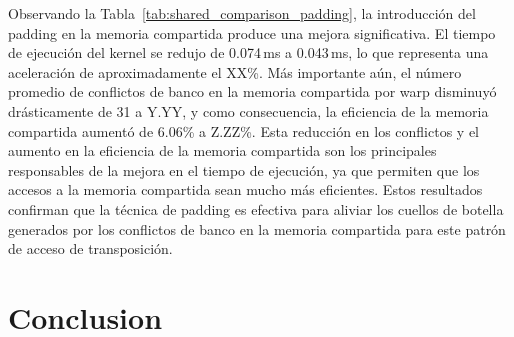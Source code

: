 \documentclass[a4paper,11pt]{article}
\begin{document}
Observando la Tabla~\ref{tab:shared_comparison_padding}, la introducción del padding en la memoria compartida produce una mejora significativa. El tiempo de ejecución del kernel se redujo de 0.074\,ms a 0.043\,ms, lo que representa una aceleración de aproximadamente el XX\%.
Más importante aún, el número promedio de conflictos de banco en la memoria compartida por warp disminuyó drásticamente de 31 a Y.YY, y como consecuencia, la eficiencia de la memoria compartida aumentó de 6.06\% a Z.ZZ\%. Esta reducción en los conflictos y el aumento en la eficiencia de la memoria compartida son los principales responsables de la mejora en el tiempo de ejecución, ya que permiten que los accesos a la memoria compartida sean mucho más eficientes.
Estos resultados confirman que la técnica de padding es efectiva para aliviar los cuellos de botella generados por los conflictos de banco en la memoria compartida para este patrón de acceso de transposición.

\section{Conclusion}
\end{document}
